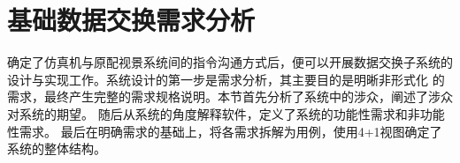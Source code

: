 



\section{基础数据交换需求分析}
确定了仿真机与原配视景系统间的指令沟通方式后，便可以开展数据交换子系统的设计与实现工作。系统设计的第一步是需求分析，其主要目的是明晰非形式化
的需求，最终产生完整的需求规格说明。本节首先分析了系统中的涉众，阐述了涉众对系统的期望。
随后从系统的角度解释软件，定义了系统的功能性需求和非功能性需求。
最后在明确需求的基础上，将各需求拆解为用例，使用4+1视图确定了系统的整体结构。
